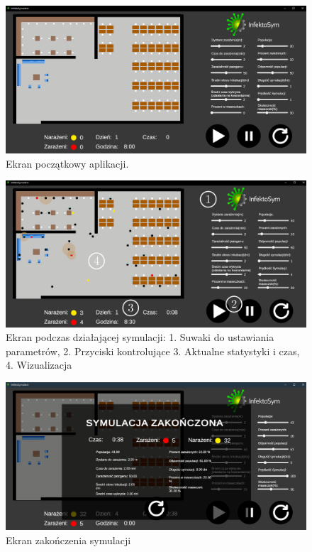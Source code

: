 \begin{figure}[h!]
	\includegraphics[width=\linewidth]{beforeSim.png}
	\caption{Ekran początkowy aplikacji.}
	\label{fig:beforeSim}
\end{figure}

\begin{figure}[h!]
	\includegraphics[width=\linewidth]{runningSimwithNumbers.png}
	\caption{Ekran podczas działającej symulacji: 1. Suwaki do ustawiania parametrów, 2. Przyciski kontrolujące 3. Aktualne statystyki i czas, 4. Wizualizacja}
	\label{fig:runningSim}
\end{figure}

\begin{figure}[h!]
	\includegraphics[width=\linewidth]{endSim.png}
	\caption{Ekran zakończenia symulacji}
	\label{fig:endSim}
\end{figure}

